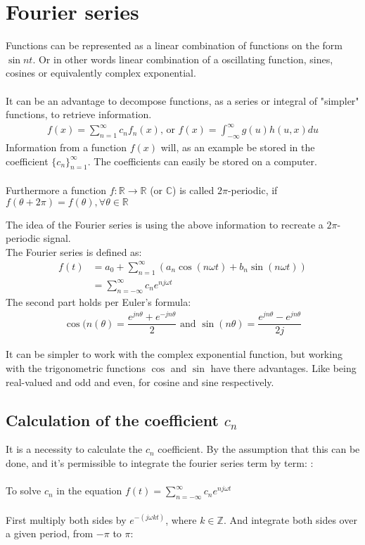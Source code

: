 \section{Fourier series}
Functions can be represented as a linear combination of functions on the form $\sin nt$.
Or in other words linear combination of a oscillating function, sines, cosines or equivalently complex exponential.
\\\\
It can be an advantage to decompose functions, as a series or integral of "simpler" functions, to retrieve information.
\begin{align*}
	f(x) = \sum_{n=1}^\infty c_n f_n(x)\text{, or } f(x)= \int_{-\infty}^\infty g(u) h(u,x) du
\end{align*}
Information from a function $f(x)$ will, as an example be stored in the coefficient $\{c_n\}_{n=1}^\infty$.
The coefficients can easily be stored on a computer.
\\\\ 
Furthermore a function $f: \mathbb{R}\to\mathbb{R}$ (or $\mathbb{C}$) is called $2\pi$-periodic, if $f(\theta + 2\pi) = f(\theta), \forall\theta\in\mathbb{R}$

The idea of the Fourier series is using the above information to recreate a $2\pi$- periodic signal.\\
The Fourier series is defined as:
\begin{align*}
	f(t) &= a_0 + \sum_{n=1}^\infty(a_n \cos(n \omega t) + b_n \sin(n \omega t))\\
	&= \sum_{n=-\infty}^{\infty} c_n e^{n j\omega t} 
\end{align*}
The second part holds per Euler's formula:
\begin{align*}
	\cos(n(\theta) = \dfrac{e^{j n \theta} + e^{-j n \theta}}{2} \text{ and } \sin(n \theta) = \dfrac{e^{jn\theta}-e^{jn\theta}}{2j}
\end{align*}

It can be simpler to work with the complex exponential function, but working with the trigonometric functions $\cos$ and $\sin$ have there advantages. 
Like being real-valued and odd and even, for cosine and sine respectively.

\subsection{Calculation of the coefficient $c_n$}
It is a necessity to calculate the $c_n$ coefficient.
By the assumption that this can be done, and it's permissible to integrate the fourier series term by term: :\\
\\
To solve $c_n$ in the equation $f(t)= \sum_{n=-\infty}^{\infty} c_n e^{n j\omega t}$
\\\\
First multiply both sides by $e^{-(j\omega k t)}$, where $k\in \mathbb{Z}$. And integrate both sides over a given period, from $-\pi$ to $\pi$:

